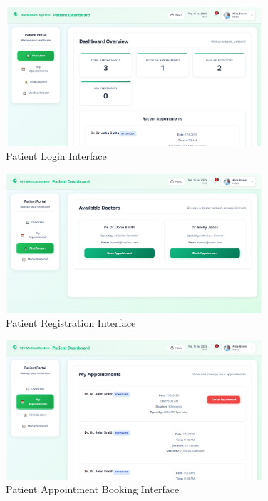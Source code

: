 \documentclass[12pt,a4paper]{article}
\begin{document}
\begin{figure}[H]
\centering
\includegraphics[width=0.85\textwidth]{patient_login.png}
\caption{Patient Login Interface}
\label{fig:patient-login}
\end{figure}

\begin{figure}[H]
\centering
\includegraphics[width=0.85\textwidth]{patient_register.png}
\caption{Patient Registration Interface}
\label{fig:patient-register}
\end{figure}

\begin{figure}[H]
\centering
\includegraphics[width=0.85\textwidth]{patient_booking.png}
\caption{Patient Appointment Booking Interface}
\label{fig:patient-booking}
\end{figure}
\end{document}

